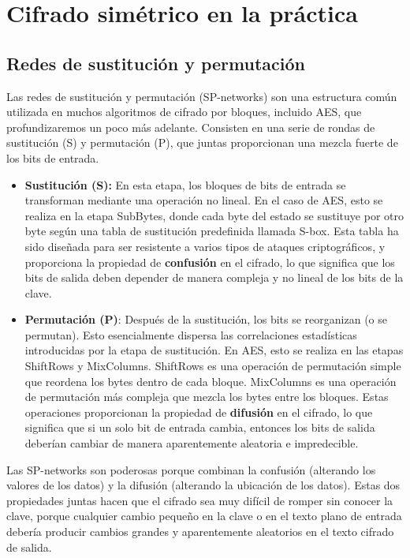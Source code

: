 \section[C. simétrico en la práctica]{Cifrado simétrico en la práctica}
\subsection{Redes de sustitución y permutación}
Las redes de sustitución y permutación (SP-networks) son una estructura común utilizada en muchos algoritmos de cifrado por bloques, incluido AES, que profundizaremos un poco más adelante. Consisten en una serie de rondas de sustitución (S) y permutación (P), que juntas proporcionan una mezcla fuerte de los bits de entrada.

\begin{itemize}
    \item \textbf{Sustitución (S):} En esta etapa, los bloques de bits de entrada se transforman mediante una operación no lineal. En el caso de AES, esto se realiza en la etapa SubBytes, donde cada byte del estado se sustituye por otro byte según una tabla de sustitución predefinida llamada S-box. Esta tabla ha sido diseñada para ser resistente a varios tipos de ataques criptográficos, y proporciona la propiedad de \textbf{confusión} en el cifrado, lo que significa que los bits de salida deben depender de manera compleja y no lineal de los bits de la clave.
    
    \item \textbf{Permutación (P)}: Después de la sustitución, los bits se reorganizan (o se permutan). Esto esencialmente dispersa las correlaciones estadísticas introducidas por la etapa de sustitución. En AES, esto se realiza en las etapas ShiftRows y MixColumns. ShiftRows es una operación de permutación simple que reordena los bytes dentro de cada bloque. MixColumns es una operación de permutación más compleja que mezcla los bytes entre los bloques. Estas operaciones proporcionan la propiedad de \textbf{difusión} en el cifrado, lo que significa que si un solo bit de entrada cambia, entonces los bits de salida deberían cambiar de manera aparentemente aleatoria e impredecible.
\end{itemize}

Las SP-networks son poderosas porque combinan la confusión (alterando los valores de los datos) y la difusión (alterando la ubicación de los datos). Estas dos propiedades juntas hacen que el cifrado sea muy difícil de romper sin conocer la clave, porque cualquier cambio pequeño en la clave o en el texto plano de entrada debería producir cambios grandes y aparentemente aleatorios en el texto cifrado de salida. \bigbreak

